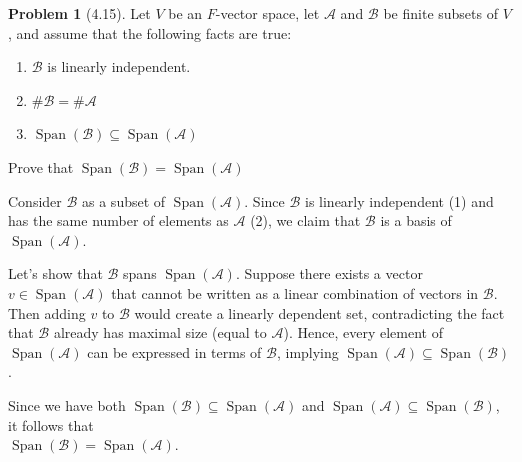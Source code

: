 \documentclass[12pt]{article}
\theoremstyle{definition}
\newtheorem{problem}{Problem}
\DeclareMathOperator{\Span}{Span}
\begin{document}
\begin{problem}[4.15]
    Let $V$ be an $F$-vector space, let $\mathcal{A}$ and $\mathcal{B}$ be finite subsets of $V$, and assume that the following facts are true:
    \begin{enumerate}[label=(\arabic*)]
        \item $\mathcal{B}$ is linearly independent.
        \item $\#\mathcal{B} = \#\mathcal{A}$
        \item $\Span(\mathcal{B}) \subseteq \Span(\mathcal{A})$
    \end{enumerate}
    Prove that $\Span(\mathcal{B}) = \Span(\mathcal{A})$

    \begin{solution}
        Consider $\mathcal{B}$ as a subset of $\Span(\mathcal{A})$. Since $\mathcal{B}$ is linearly independent (1) and has the same number of elements as $\mathcal{A}$ (2), we claim that $\mathcal{B}$ is a basis of \( \Span(\mathcal{A}) \). 

        Let's show that $\mathcal{B}$ spans $\Span(\mathcal{A})$. Suppose there exists a vector 
        $v \in \Span(\mathcal{A})$ that cannot be written as a linear combination of vectors in 
        $\mathcal{B}$. Then adding $v$ to $\mathcal{B}$ would create a linearly dependent set, 
        contradicting the fact that $\mathcal{B}$ already has maximal size (equal to 
        $\mathcal{A}$). Hence, every element of $\Span(\mathcal{A})$ can be expressed in terms 
        of $\mathcal{B}$, implying $\Span(\mathcal{A}) \subseteq \Span(\mathcal{B})$.

        Since we have both $\Span(\mathcal{B}) \subseteq \Span(\mathcal{A})$ and 
        $\Span(\mathcal{A}) \subseteq \Span(\mathcal{B})$, it follows that\\
        $\Span(\mathcal{B}) = \Span(\mathcal{A})$.

    \end{solution}
\end{problem}
\end{document}
